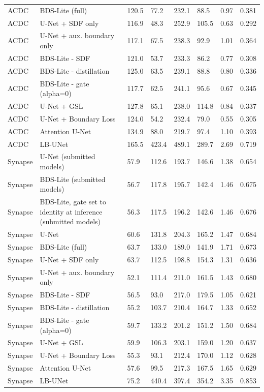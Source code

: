 \begin{tabular}{llllllll}
ACDC & BDS-Lite (full) & 120.5 & 77.2 & 232.1 & 88.5 & 0.97 & 0.381 \\
ACDC & U-Net + SDF only & 116.9 & 48.3 & 252.9 & 105.5 & 0.63 & 0.292 \\
ACDC & U-Net + aux. boundary only & 117.1 & 67.5 & 238.3 & 92.9 & 1.01 & 0.364 \\
ACDC & BDS-Lite - SDF & 121.0 & 53.7 & 233.3 & 86.2 & 0.77 & 0.308 \\
ACDC & BDS-Lite - distillation & 125.0 & 63.5 & 239.1 & 88.8 & 0.80 & 0.336 \\
ACDC & BDS-Lite - gate (alpha=0) & 117.7 & 62.5 & 241.1 & 95.6 & 0.67 & 0.345 \\
ACDC & U-Net + GSL & 127.8 & 65.1 & 238.0 & 114.8 & 0.84 & 0.337 \\
ACDC & U-Net + Boundary Loss & 124.0 & 54.2 & 232.4 & 79.0 & 0.55 & 0.305 \\
ACDC & Attention U-Net & 134.9 & 88.0 & 219.7 & 97.4 & 1.10 & 0.393 \\
ACDC & LB-UNet & 165.5 & 423.4 & 489.1 & 289.7 & 2.69 & 0.719 \\
Synapse & U-Net (submitted models) & 57.9 & 112.6 & 193.7 & 146.6 & 1.38 & 0.654 \\
Synapse & BDS-Lite (submitted models) & 56.7 & 117.8 & 195.7 & 142.4 & 1.46 & 0.675 \\
Synapse & BDS-Lite, gate set to identity at inference (submitted models) & 56.3 & 117.5 & 196.2 & 142.6 & 1.46 & 0.676 \\
Synapse & U-Net & 60.6 & 131.8 & 204.3 & 165.2 & 1.47 & 0.684 \\
Synapse & BDS-Lite (full) & 63.7 & 133.0 & 189.0 & 141.9 & 1.71 & 0.673 \\
Synapse & U-Net + SDF only & 63.7 & 112.5 & 198.8 & 154.3 & 1.31 & 0.636 \\
Synapse & U-Net + aux. boundary only & 52.1 & 111.4 & 211.0 & 161.5 & 1.43 & 0.680 \\
Synapse & BDS-Lite - SDF & 56.5 & 93.0 & 217.0 & 179.5 & 1.05 & 0.621 \\
Synapse & BDS-Lite - distillation & 55.2 & 103.7 & 210.4 & 164.7 & 1.33 & 0.652 \\
Synapse & BDS-Lite - gate (alpha=0) & 59.7 & 133.2 & 201.2 & 151.2 & 1.50 & 0.684 \\
Synapse & U-Net + GSL & 59.9 & 106.3 & 203.1 & 159.0 & 1.20 & 0.637 \\
Synapse & U-Net + Boundary Loss & 55.3 & 93.1 & 212.4 & 170.0 & 1.12 & 0.628 \\
Synapse & Attention U-Net & 57.6 & 99.5 & 217.3 & 167.5 & 1.65 & 0.629 \\
Synapse & LB-UNet & 75.2 & 440.4 & 397.4 & 354.2 & 3.35 & 0.853 \\
\bottomrule
\end{tabular}
